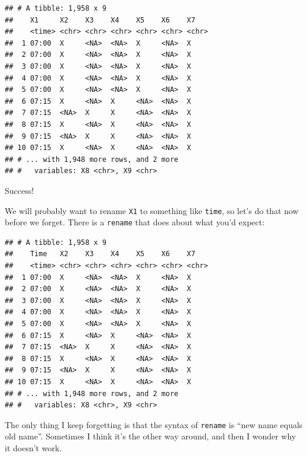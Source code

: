 \documentclass[]{tufte-book}
\newenvironment{Shaded}{}{}
\newcommand{\DataTypeTok}[1]{\textcolor[rgb]{0.56,0.13,0.00}{#1}}
\newcommand{\KeywordTok}[1]{\textcolor[rgb]{0.00,0.44,0.13}{\textbf{#1}}}
\newcommand{\NormalTok}[1]{#1}
\newcommand{\OperatorTok}[1]{\textcolor[rgb]{0.40,0.40,0.40}{#1}}
\newcommand{\StringTok}[1]{\textcolor[rgb]{0.25,0.44,0.63}{#1}}
\theoremstyle{definition}
\theoremstyle{definition}
\theoremstyle{definition}
\theoremstyle{remark}
\begin{document}
\begin{verbatim}
## # A tibble: 1,958 x 9
##    X1     X2    X3    X4    X5    X6    X7   
##    <time> <chr> <chr> <chr> <chr> <chr> <chr>
##  1 07:00  X     <NA>  <NA>  X     <NA>  X    
##  2 07:00  X     <NA>  <NA>  X     <NA>  X    
##  3 07:00  X     <NA>  <NA>  X     <NA>  X    
##  4 07:00  X     <NA>  <NA>  X     <NA>  X    
##  5 07:00  X     <NA>  <NA>  X     <NA>  X    
##  6 07:15  X     <NA>  X     <NA>  <NA>  X    
##  7 07:15  <NA>  X     X     <NA>  <NA>  X    
##  8 07:15  X     <NA>  X     <NA>  <NA>  X    
##  9 07:15  <NA>  X     X     <NA>  <NA>  X    
## 10 07:15  X     <NA>  X     <NA>  <NA>  X    
## # ... with 1,948 more rows, and 2 more
## #   variables: X8 <chr>, X9 <chr>
\end{verbatim}

Success!

We will probably want to rename \texttt{X1} to something like
\texttt{time}, so let's do that now before we forget. There is a
\texttt{rename} that does about what you'd expect:

\begin{Shaded}
\end{Shaded}

\begin{verbatim}
## # A tibble: 1,958 x 9
##    Time   X2    X3    X4    X5    X6    X7   
##    <time> <chr> <chr> <chr> <chr> <chr> <chr>
##  1 07:00  X     <NA>  <NA>  X     <NA>  X    
##  2 07:00  X     <NA>  <NA>  X     <NA>  X    
##  3 07:00  X     <NA>  <NA>  X     <NA>  X    
##  4 07:00  X     <NA>  <NA>  X     <NA>  X    
##  5 07:00  X     <NA>  <NA>  X     <NA>  X    
##  6 07:15  X     <NA>  X     <NA>  <NA>  X    
##  7 07:15  <NA>  X     X     <NA>  <NA>  X    
##  8 07:15  X     <NA>  X     <NA>  <NA>  X    
##  9 07:15  <NA>  X     X     <NA>  <NA>  X    
## 10 07:15  X     <NA>  X     <NA>  <NA>  X    
## # ... with 1,948 more rows, and 2 more
## #   variables: X8 <chr>, X9 <chr>
\end{verbatim}

The only thing I keep forgetting is that the syntax of \texttt{rename}
is ``new name equals old name''. Sometimes I think it's the other way
around, and then I wonder why it doesn't work.
\end{document}
